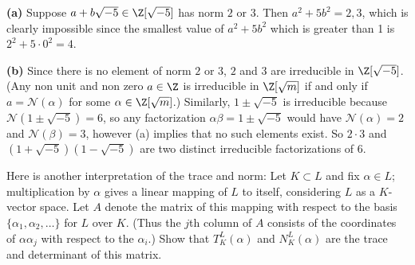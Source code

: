 \documentclass[11pt,letterpaper]{article}
\begin{document}
\begin{solution}
    \textbf{(a)} Suppose $a+b\sqrt{-5} \in \Z[\sqrt{-5}]$ has norm $2$ or $3$. Then $a^2+5b^2=2,3$, which is clearly impossible since the smallest value of $a^2+5b^2$ which is greater than 1 is $2^2+5\cdot 0^2=4$.   
    
    \textbf{(b)} Since there is no element of norm $2$ or $3$, $2$ and $3$ are irreducible in $\Z[\sqrt{-5}]$. (Any non unit and non zero $a\in \Z$ is irreducible in $\Z[\sqrt{m}]$ if and only if $a=\mathcal{N}(\alpha)$ for some $\alpha\in \Z[\sqrt{m}]$.) Similarly, $1\pm \sqrt{-5}$ is irreducible because $\mathcal{N}(1\pm\sqrt{-5})=6$, so any factorization $\alpha\beta=1\pm\sqrt{-5}$ would have $\mathcal{N}(\alpha)=2$ and $\mathcal{N}(\beta)=3$, however (a) implies that no such elements exist. So $2\cdot 3$ and $(1+\sqrt{-5})(1-\sqrt{-5})$ are two distinct irreducible factorizations of $6$. 
\end{solution}

\begin{cproblem}{2.17}
    Here is another interpretation of the trace and norm: Let $K\subset L$ and fix $\alpha\in L$; multiplication by $\alpha$ gives a linear mapping of $L$ to itself, considering $L$ as a $K$-vector space. Let $A$ denote the matrix of this mapping with respect to the basis $\{\alpha_1, \alpha_2,\ldots\}$ for $L$ over $K$. (Thus the $j$th column of $A$ consists of the coordinates of $\alpha \alpha_j$ with respect to the $\alpha_i$.) Show that $T^L_K(\alpha)$ and $N^L_K(\alpha)$ are the trace and determinant of this matrix.    
\end{cproblem}

\end{document}
